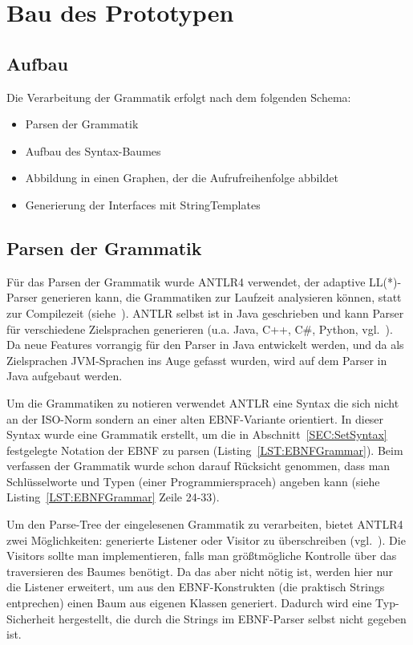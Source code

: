 \documentclass[../InterneDSLs.tex]{subfiles}
\begin{document}
\chapter{Bau des Prototypen}\label{SEC:Prototype}

\section{Aufbau}
Die Verarbeitung der Grammatik erfolgt nach dem folgenden Schema:
\begin{itemize}
	\item Parsen der Grammatik
	\item Aufbau des Syntax-Baumes
	\item Abbildung in einen Graphen, der die Aufrufreihenfolge abbildet
	\item Generierung der Interfaces mit StringTemplates
\end{itemize}

\section{Parsen der Grammatik}
Für das Parsen der Grammatik wurde ANTLR4 verwendet, der adaptive LL(*)-Parser generieren kann, die Grammatiken zur Laufzeit analysieren können, statt zur Compilezeit (siehe~\cite[S. xiii ff]{Parr.2012}). ANTLR selbst ist in Java geschrieben und kann Parser für verschiedene Zielsprachen generieren (u.a. Java, C++, C\#, Python, vgl.~\cite{antlrcodegeneration.github}). Da neue Features vorrangig für den Parser in Java entwickelt werden, und da als Zielsprachen JVM-Sprachen ins Auge gefasst wurden, wird auf dem Parser in Java aufgebaut werden.

Um die Grammatiken zu notieren verwendet ANTLR eine Syntax die sich nicht an der ISO-Norm sondern an einer alten EBNF-Variante orientiert. In dieser Syntax wurde eine Grammatik erstellt, um die in Abschnitt~\ref{SEC:SetSyntax} festgelegte Notation der EBNF zu parsen (Listing~\ref{LST:EBNFGrammar}). Beim verfassen der Grammatik wurde schon darauf Rücksicht genommen, dass man Schlüsselworte und Typen (einer Programmierspraceh) angeben kann (siehe Listing~\ref{LST:EBNFGrammar} Zeile 24-33).

\begin{figure}[ht]

\end{figure}

Um den Parse-Tree der eingelesenen Grammatik zu verarbeiten, bietet ANTLR4 zwei Möglichkeiten: generierte Listener oder Visitor zu überschreiben (vgl.~\cite[S. 112 ff]{Parr.2012}). Die Visitors sollte man implementieren, falls man größtmögliche Kontrolle über das traversieren des Baumes benötigt. Da das aber nicht nötig ist, werden hier nur die Listener erweitert, um aus den EBNF-Konstrukten (die praktisch Strings entprechen) einen Baum aus eigenen Klassen generiert. Dadurch wird eine Typ-Sicherheit hergestellt, die durch die Strings im EBNF-Parser selbst nicht gegeben ist.
\end{document}
